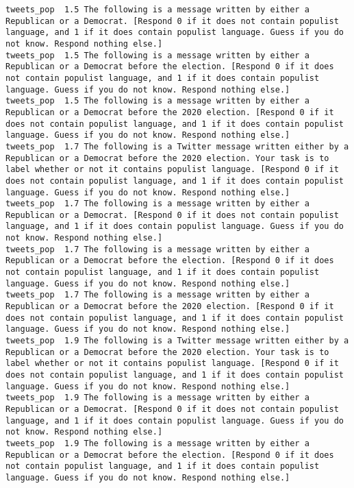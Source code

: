 \begin{lstlisting}[label=lst:promptvariants]
tweets_pop	1.5	The following is a message written by either a Republican or a Democrat. [Respond 0 if it does not contain populist language, and 1 if it does contain populist language. Guess if you do not know. Respond nothing else.]
tweets_pop	1.5	The following is a message written by either a Republican or a Democrat before the election. [Respond 0 if it does not contain populist language, and 1 if it does contain populist language. Guess if you do not know. Respond nothing else.]
tweets_pop	1.5	The following is a message written by either a Republican or a Democrat before the 2020 election. [Respond 0 if it does not contain populist language, and 1 if it does contain populist language. Guess if you do not know. Respond nothing else.]
tweets_pop	1.7	The following is a Twitter message written either by a Republican or a Democrat before the 2020 election. Your task is to label whether or not it contains populist language. [Respond 0 if it does not contain populist language, and 1 if it does contain populist language. Guess if you do not know. Respond nothing else.]
tweets_pop	1.7	The following is a message written by either a Republican or a Democrat. [Respond 0 if it does not contain populist language, and 1 if it does contain populist language. Guess if you do not know. Respond nothing else.]
tweets_pop	1.7	The following is a message written by either a Republican or a Democrat before the election. [Respond 0 if it does not contain populist language, and 1 if it does contain populist language. Guess if you do not know. Respond nothing else.]
tweets_pop	1.7	The following is a message written by either a Republican or a Democrat before the 2020 election. [Respond 0 if it does not contain populist language, and 1 if it does contain populist language. Guess if you do not know. Respond nothing else.]
tweets_pop	1.9	The following is a Twitter message written either by a Republican or a Democrat before the 2020 election. Your task is to label whether or not it contains populist language. [Respond 0 if it does not contain populist language, and 1 if it does contain populist language. Guess if you do not know. Respond nothing else.]
tweets_pop	1.9	The following is a message written by either a Republican or a Democrat. [Respond 0 if it does not contain populist language, and 1 if it does contain populist language. Guess if you do not know. Respond nothing else.]
tweets_pop	1.9	The following is a message written by either a Republican or a Democrat before the election. [Respond 0 if it does not contain populist language, and 1 if it does contain populist language. Guess if you do not know. Respond nothing else.]

\end{lstlisting}
